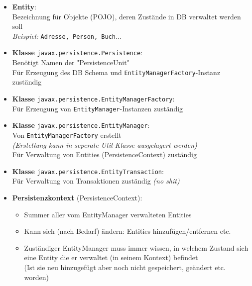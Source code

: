 \documentclass[a4paper]{article}
\begin{document}
			\begin{itemize}
				\item \textbf{Entity}:\\
						Bezeichnung für Objekte (POJO), deren Zustände in DB verwaltet werden soll\\
						\textit{Beispiel:} \texttt{Adresse, Person, Buch}...
						
				\item \textbf{Klasse} \texttt{javax.persistence.Persistence}:\\
						Benötigt Namen der "PersistenceUnit"\\
						Für Erzeugung des DB Schema und \texttt{EntityManagerFactory}-Instanz zuständig
						
				\item \textbf{Klasse} \texttt{javax.persistence.EntityManagerFactory}:\\
						Für Erzeugung von \texttt{EntityManager}-Instanzen zuständig
						
				\item \textbf{Klasse} \texttt{javax.persistence.EntityManager}:\\
						Von \texttt{EntityManagerFactory} erstellt\\
						\textit{(Erstellung kann in seperate Util-Klasse ausgelagert werden)}\\
						Für Verwaltung von Entities (PersistenceContext) zuständig
						
				\item \textbf{Klasse} \texttt{javax.persistence.EntityTransaction}:\\
						Für Verwaltung von Transaktionen zuständig \textit{(no shit)}
						
				\item \textbf{Persistenzkontext} (PersistenceContext):
						\begin{itemize}
							\item Summer aller vom EntityManager verwalteten Entities
							\item Kann sich (nach Bedarf) ändern: Entities hinzufügen/entfernen etc.
							\item Zuständiger EntityManager muss immer wissen, in welchem Zustand sich eine Entity die er verwaltet (in seinem Kontext) befindet\\
							(Ist sie neu hinzugefügt aber noch nicht gespeichert, geändert etc. worden)
						\end{itemize}
			\end{itemize}
		
\end{document}
